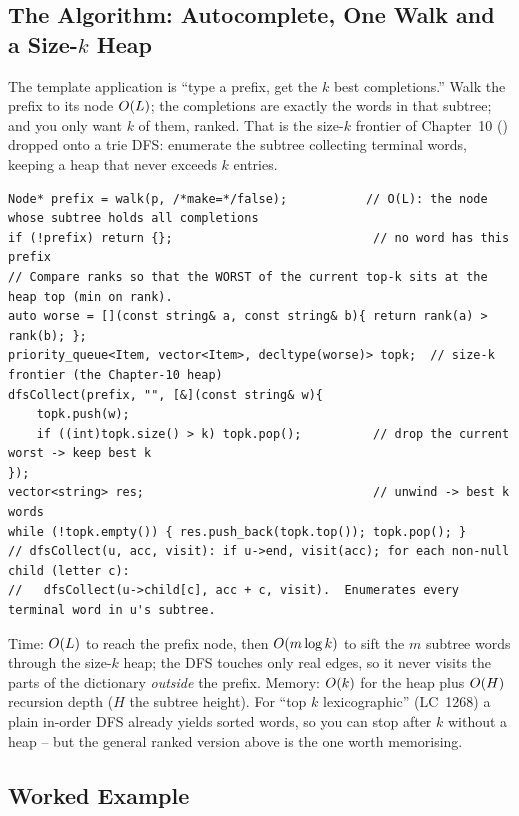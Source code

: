 \subsection{The Algorithm: Autocomplete, One Walk and a Size-$k$ Heap}

The template application is ``type a prefix, get the $k$ best completions.'' Walk the prefix to its node
$O(L)$; the completions are exactly the words in that subtree; and you only want $k$ of them, ranked.
That is the size-$k$ frontier of Chapter~10 () dropped onto a trie DFS: enumerate the subtree
collecting terminal words, keeping a heap that never exceeds $k$ entries.

\begin{lstlisting}[caption={Top-k autocomplete: walk the prefix, DFS the subtree, hold a size-k heap}, label={lst:c08-autocomplete}]
Node* prefix = walk(p, /*make=*/false);           // O(L): the node whose subtree holds all completions
if (!prefix) return {};                            // no word has this prefix
// Compare ranks so that the WORST of the current top-k sits at the heap top (min on rank).
auto worse = [](const string& a, const string& b){ return rank(a) > rank(b); };
priority_queue<Item, vector<Item>, decltype(worse)> topk;  // size-k frontier (the Chapter-10 heap)
dfsCollect(prefix, "", [&](const string& w){
    topk.push(w);
    if ((int)topk.size() > k) topk.pop();          // drop the current worst -> keep best k
});
vector<string> res;                                // unwind -> best k words
while (!topk.empty()) { res.push_back(topk.top()); topk.pop(); }
// dfsCollect(u, acc, visit): if u->end, visit(acc); for each non-null child (letter c):
//   dfsCollect(u->child[c], acc + c, visit).  Enumerates every terminal word in u's subtree.
\end{lstlisting}

\begin{complexitybox}
Time: $O(L)$ to reach the prefix node, then $O(m\log k)$ to sift the $m$ subtree words through
the size-$k$ heap; the DFS touches only real edges, so it never visits the parts of the dictionary
\emph{outside} the prefix. Memory: $O(k)$ for the heap plus $O(H)$ recursion depth ($H$ the
subtree height). For ``top $k$ lexicographic'' (LC~1268) a plain in-order DFS already yields sorted
words, so you can stop after $k$ without a heap -- but the general ranked version above is the one worth
memorising.
\end{complexitybox}

\subsection{Worked Example}

